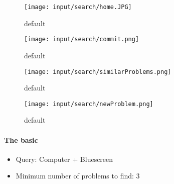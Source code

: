 \begin{frame}
\begin{figure}[htbp]
\begin{center}
\texttt{[image: input/search/home.JPG]}
\caption{default}
\label{default}
\end{center}
\end{figure}

\end{frame}

\begin{frame}

\begin{figure}[htbp]
\begin{center}
\texttt{[image: input/search/commit.png]}
\caption{default}
\label{default}
\end{center}
\end{figure}

\end{frame}

\begin{frame}

\begin{figure}[htbp]
\begin{center}
\texttt{[image: input/search/similarProblems.png]}
\caption{default}
\label{default}
\end{center}
\end{figure}

\end{frame}

\begin{frame}

\begin{figure}[htbp]
\begin{center}
\texttt{[image: input/search/newProblem.png]}
\caption{default}
\label{default}
\end{center}
\end{figure}

\end{frame}


\begin{frame}
\paragraph{The basic}
\begin{itemize}
\item Query: Computer + Bluescreen
\item Minimum number of problems to find: 3
\end{itemize}
\end{frame}
